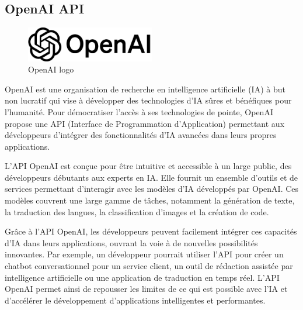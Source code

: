 \documentclass[a4paper,12pt]{report}
\numberwithin{equation}{section}
\begin{document}
\subsection{OpenAI API}
\vspace{1cm}
\begin{figure}[H]
    \centering
    \includegraphics[width=0.5\textwidth]{tech/openai-logo.png}
    \caption{OpenAI logo}
    \label{fig:OpenAI logo}
\end{figure}
\vspace{1cm}
\par
OpenAI est une organisation de recherche en intelligence artificielle (IA) à but non lucratif qui vise à développer des technologies d'IA sûres et bénéfiques pour l'humanité. Pour démocratiser l'accès à ses technologies de pointe, OpenAI propose une API (Interface de Programmation d'Application) permettant aux développeurs d'intégrer des fonctionnalités d'IA avancées dans leurs propres applications.
\\ \par
L'API OpenAI est conçue pour être intuitive et accessible à un large public, des développeurs débutants aux experts en IA. Elle fournit un ensemble d'outils et de services permettant d'interagir avec les modèles d'IA développés par OpenAI. Ces modèles couvrent une large gamme de tâches, notamment la génération de texte, la traduction des langues, la classification d'images et la création de code.
\\ \par
Grâce à l'API OpenAI, les développeurs peuvent facilement intégrer ces capacités d'IA dans leurs applications, ouvrant la voie à de nouvelles possibilités innovantes. Par exemple, un développeur pourrait utiliser l'API pour créer un chatbot conversationnel pour un service client, un outil de rédaction assistée par intelligence artificielle ou une application de traduction en temps réel. L'API OpenAI permet ainsi de repousser les limites de ce qui est possible avec l'IA et d'accélérer le développement d'applications intelligentes et performantes.
\end{document}
